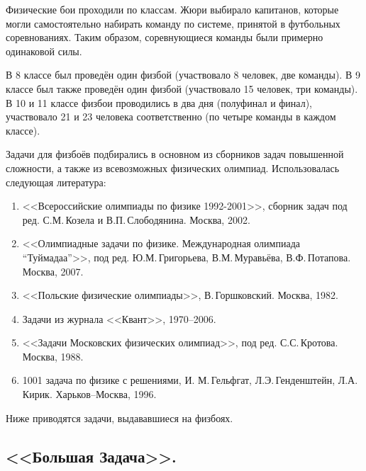 \documentclass[12pt,a4paper,oneside,draft]{scrartcl}
\newlength{\h}
\begin{document}
Физические бои проходили по классам. Жюри выбирало капитанов, которые
могли самостоятельно набирать команду по системе, принятой в
футбольных соревнованиях. Таким образом, соревнующиеся команды были
примерно одинаковой силы.

В 8 классе был проведён один физбой (участвовало 8 человек, две
команды). В 9 классе был также проведён один физбой (участвовало 15
человек, три команды). В 10 и 11 классе физбои проводились в два дня
(полуфинал и финал), участвовало 21 и 23 человека соответственно
(по четыре команды в каждом классе). 

Задачи для физбоёв подбирались в основном из сборников задач повышенной
сложности, а также из всевозможных физических олимпиад. Использовалась
следующая литература: 

\begin{enumerate}
\item <<Всероссийские олимпиады по физике 1992-2001>>, сборник задач
  под ред. С.М.\,Ко\-зе\-ла и В.П.\,Слободянина. Москва, 2002.
\item <<Олимпиадные задачи по физике. Международная олимпиада
  ``Туймадаа''>>, под ред. Ю.М.\,Григорьева, В.М.\,Муравьёва,
  В.Ф.\,Потапова. Москва, 2007.
\item <<Польские физические олимпиады>>, В.\,Горшковский. Москва,
  1982.
\item Задачи из журнала <<Квант>>, 1970--2006. 
\item <<Задачи Московских физических олимпиад>>, под ред.
  С.С.\,Кротова. Москва, 1988.
\item 1001 задача по физике с решениями, И. М.\,Гельфгат, 
  Л.Э.\,Генденштейн, Л.А.\,Кирик. Харьков--Москва, 1996.
\end{enumerate}

Ниже приводятся задачи, выдававшиеся на физбоях. 


% 

% 

% 

% 

% 

% 


\parindent=5mm
\subsection{<<Большая Задача>>.}
\label{sec:bz}
\end{document}
